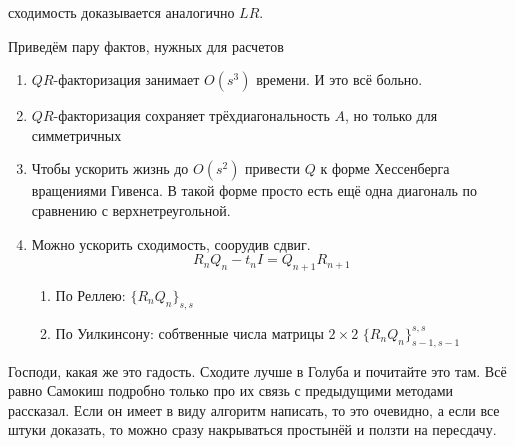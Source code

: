 \documentclass{trlnotes}
\begin{document}
сходимость доказывается аналогично $LR$.

Приведём пару фактов, нужных для расчетов
\begin{enumerate}
  \item $QR$-факторизация занимает $O(s^3)$ времени. И это всё больно.
  \item $QR$-факторизация сохраняет трёхдиагональность $A$, но только для
    симметричных
  \item Чтобы ускорить жизнь до $O(s^2)$  привести $Q$
    к форме Хессенберга вращениями Гивенса.
    В такой форме просто есть ещё одна диагональ по сравнению с
    верхнетреугольной.
  \item Можно ускорить сходимость, соорудив сдвиг.
    \[
      R_n Q_n - t_n I = Q_{n+1} R_{n+1}
    \]
    \begin{enumerate}
      \item По Реллею: $\{R_nQ_n\}_{s,s}$
      \item По Уилкинсону: собтвенные числа матрицы $2 × 2$ $\{R_nQ_n\}^{s,s}_{s-1,s-1}$
    \end{enumerate}
\end{enumerate}

\vfil

Господи, какая же это гадость. Сходите лучше в Голуба и почитайте это там.
Всё равно Самокиш подробно только про их связь с предыдущими методами рассказал.
Если он имеет в виду алгоритм написать, то это очевидно, а если все штуки
доказать, то можно сразу накрываться простынёй и ползти на пересдачу.
\end{document}

